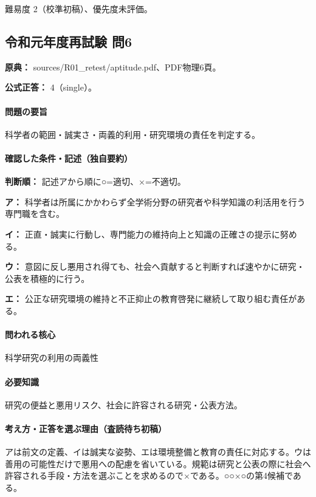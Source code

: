 \par 難易度 2（校準初稿）、優先度未評価。

\subsection{令和元年度再試験 問6}
\label{q:r01-ret-apt-06}

\noindent\textbf{原典：} sources/R01\_retest/aptitude.pdf、PDF物理6頁。

\textbf{公式正答：} 4（single）。

\paragraph{問題の要旨} 科学者の範囲・誠実さ・両義的利用・研究環境の責任を判定する。

\paragraph{確認した条件・記述（独自要約）}\mbox{}\par

\noindent\textbf{判断順：} 記述アから順に○=適切、×=不適切。\par

\noindent\textbf{ア：} 科学者は所属にかかわらず全学術分野の研究者や科学知識の利活用を行う専門職を含む。\par

\noindent\textbf{イ：} 正直・誠実に行動し、専門能力の維持向上と知識の正確さの提示に努める。\par

\noindent\textbf{ウ：} 意図に反し悪用され得ても、社会へ貢献すると判断すれば速やかに研究・公表を積極的に行う。\par

\noindent\textbf{エ：} 公正な研究環境の維持と不正抑止の教育啓発に継続して取り組む責任がある。\par

\paragraph{問われる核心} 科学研究の利用の両義性

\paragraph{必要知識} 研究の便益と悪用リスク、社会に許容される研究・公表方法。

\paragraph{考え方・正答を選ぶ理由（査読待ち初稿）} アは前文の定義、イは誠実な姿勢、エは環境整備と教育の責任に対応する。ウは善用の可能性だけで悪用への配慮を省いている。規範は研究と公表の際に社会へ許容される手段・方法を選ぶことを求めるので×である。○○×○の第4候補である。

